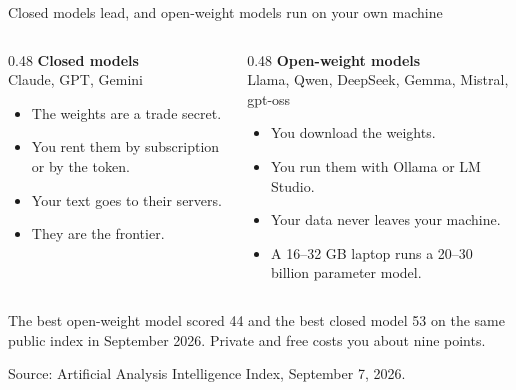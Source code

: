 \documentclass[aspectratio=169,11pt]{beamer}
\begin{document}
\begin{frame}{Closed models lead, and open-weight models run on your own machine}

\begin{columns}[T]
\begin{column}{0.48\textwidth}
\textbf{Closed models} \\
\textcolor{warmgray}{\scriptsize Claude, GPT, Gemini}

\vspace{0.2cm}
\begin{itemize}\setlength\itemsep{0.2em}
    \item The weights are a trade secret.
    \item You rent them by subscription or by the token.
    \item Your text goes to their servers.
    \item They are the frontier.
\end{itemize}
\end{column}
\begin{column}{0.48\textwidth}
\textbf{Open-weight models} \\
\textcolor{warmgray}{\scriptsize Llama, Qwen, DeepSeek, Gemma, Mistral, gpt-oss}

\vspace{0.2cm}
\begin{itemize}\setlength\itemsep{0.2em}
    \item You download the weights.
    \item You run them with Ollama or LM Studio.
    \item Your data never leaves your machine.
    \item A 16--32 GB laptop runs a 20--30 billion parameter model.
\end{itemize}
\end{column}
\end{columns}

\vspace{0.35cm}

\alert{The best open-weight model scored 44 and the best closed model 53 on the same public index in September 2026. Private and free costs you about nine points.}

\vspace{0.1cm}
{\scriptsize\color{warmgray}Source: Artificial Analysis Intelligence Index, September 7, 2026.}

\end{frame}
\end{document}
